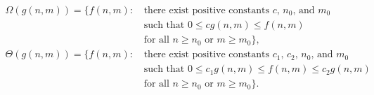 \setlength{\abovedisplayskip}{-\baselineskip}
\begin{align*}
    \Omega(g(n,m)) = \{f(n,m):\,{} & \text{there exist positive constants $c$, $n_0$, and $m_0$} \\
    & \text{such that } 0 \le cg(n,m) \le f(n,m) \\
    & \text{for all $n \ge n_0$ or $m \ge m_0$}\}, \\[2mm]
    \Theta(g(n,m)) = \{f(n,m):\,{} & \text{there exist positive constants $c_1$, $c_2$, $n_0$, and $m_0$} \\
    & \text{such that } 0 \le c_1g(n,m) \le f(n,m) \le c_2g(n,m) \\
    & \text{for all $n \ge n_0$ or $m \ge m_0$}\}.
\end{align*}
